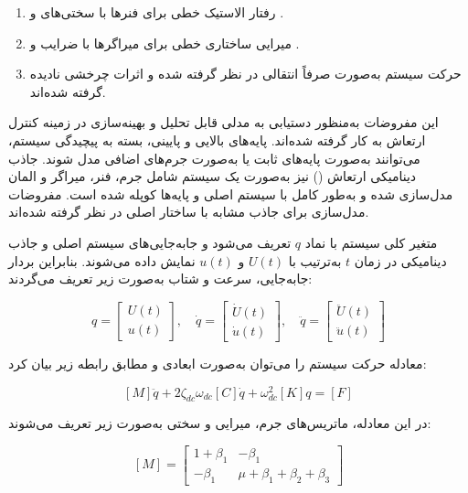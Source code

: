 \begin{enumerate}
  \item رفتار الاستیک خطی برای فنرها با سختی‌های  و .
  \item میرایی ساختاری خطی برای میراگرها با ضرایب  و .
  \item حرکت سیستم به‌صورت صرفاً انتقالی در نظر گرفته شده و اثرات چرخشی نادیده گرفته شده‌اند.
\end{enumerate}

این مفروضات به‌منظور دستیابی به مدلی قابل تحلیل و بهینه‌سازی در زمینه کنترل ارتعاش به کار گرفته شده‌اند. پایه‌های بالایی و پایینی، بسته به پیچیدگی سیستم، می‌توانند به‌صورت پایه‌های ثابت یا به‌صورت جرم‌های اضافی مدل شوند. جاذب دینامیکی ارتعاش () نیز به‌صورت یک سیستم  شامل جرم، فنر، میراگر و المان  مدل‌سازی شده و به‌طور کامل با سیستم اصلی و پایه‌ها کوپله شده است. مفروضات مدل‌سازی برای جاذب مشابه با ساختار اصلی در نظر گرفته شده‌اند.

متغیر کلی سیستم با نماد $q$ تعریف می‌شود و جابه‌جایی‌های سیستم اصلی و جاذب دینامیکی در زمان $t$ به‌ترتیب با $U(t)$ و $u(t)$ نمایش داده می‌شوند. بنابراین بردار جابه‌جایی، سرعت و شتاب به‌صورت زیر تعریف می‌گردند:

\begin{equation}
q = 
\begin{bmatrix}
U(t) \\
u(t)
\end{bmatrix}, \quad
\dot{q} = 
\begin{bmatrix}
\dot{U}(t) \\
\dot{u}(t)
\end{bmatrix}, \quad
\ddot{q} = 
\begin{bmatrix}
\ddot{U}(t) \\
\ddot{u}(t)
\end{bmatrix}
\end{equation}

معادله حرکت سیستم را می‌توان به‌صورت ابعادی و مطابق رابطه زیر بیان کرد:

\begin{equation}
\left[M\right]\ddot{q} + 2\zeta_{dc}\omega_{dc}\left[C\right]\dot{q} + \omega_{dc}^2\left[K\right]q = \left[F\right]
\end{equation}

در این معادله، ماتریس‌های جرم، میرایی و سختی به‌صورت زیر تعریف می‌شوند:

\begin{equation}
\left[M\right] = 
\begin{bmatrix}
1 + \beta_1 & -\beta_1 \\
-\beta_1 & \mu + \beta_1 + \beta_2 + \beta_3
\end{bmatrix}
\end{equation}


